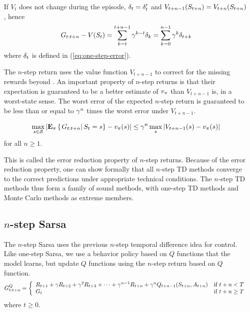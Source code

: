 If $V_t$ does not change during the episode, $\delta_{t} = \delta'_{t}$ and $V_{t+n-1}(S_{t+n}) = V_{t+n}(S_{t+n})$,
hence
\begin{equation}
G_{{t}:{t+n}} - V(S_{t})
= \sum_{k=t}^{t+n-1} \gamma^{k-t}\delta_{k}
= \sum_{k=0}^{n-1} \gamma^{k}\delta_{t+k}
\end{equation}
where $\delta_{t}$ is defined in (\ref{eq:one-step-error}).

The $n$-step return uses the value function $V_{t + n-1}$
to correct for the missing rewards beyond .
An important property of $n$-step returns is
that their expectation is guaranteed to be a better estimate of $v_{\pi}$ than $V_{t+n-1}$ is,
in a worst-state sense.
The worst error of the expected $n$-step return
is guaranteed to be less than or equal to $\gamma^n$ times the worst error under $V_{t + n - 1}$.

\begin{equation}
\max_{s \in \mathcal{S}} \left| \mathbf{E}_{\pi} \left\{\left.G_{{t}:{t+n}}\right|S_{t}=s\right\} - v_{\pi}(s) \right|
\leq
\gamma^n
\max_s \left| V_{t+n-1}(s) - v_{\pi}(s) \right|
\end{equation}
for all $n\geq1$.

This is called the error reduction property of $n$-step returns.
Because of the error reduction property,
one can show formally that all $n$-step TD methods converge to the correct predictions under appropriate technical conditions.
The $n$-step TD methods thus form a family of sound methods,
with one-step TD methods and Monte Carlo methods as extreme members.





\subsection{$n$-step Sarsa}

The $n$-step Sarsa uses the previous $n$-step temporal difference idea for control.
Like one-step Sarsa, we use a behavior policy based on $Q$ functions that the model learns,
but update $Q$ functions using the $n$-step return based on $Q$ function.
\begin{equation}
G^{Q}_{{t}:{t+n}} = \left\{\begin{array}{ll}
R_{t+1} + \gamma R_{t+2} + \gamma^2 R_{t+3} + \cdots + \gamma^{n-1} R_{t+n} + \gamma^n Q_{t+n-1}(S_{t+n}, A_{t+n})
&\mbox{if } t+n < T
\\
G_{{t}} & \mbox{if } t+n \geq T
\end{array}\right.
\end{equation}
where $t\geq0$.

